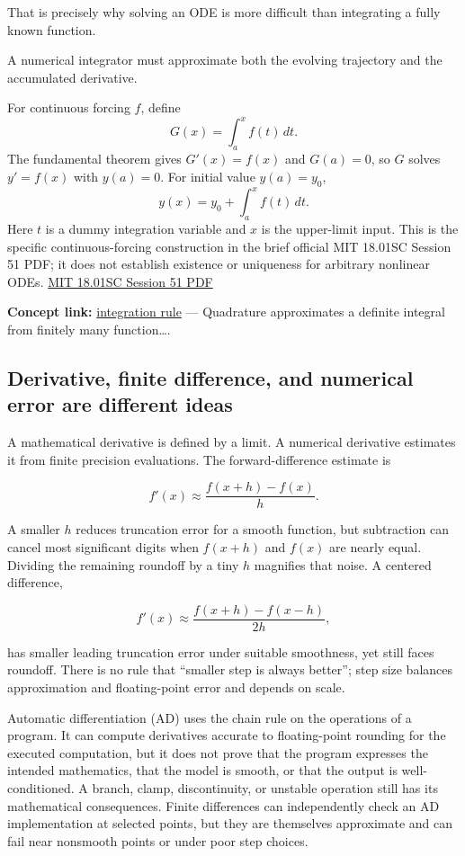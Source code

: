That is precisely why solving an ODE is more difficult than integrating a fully known function.

A numerical integrator must approximate both the evolving trajectory and the accumulated derivative.

For continuous forcing \(f\), define \[
G(x)=\int_a^x f(t)\,dt.
\] The fundamental theorem gives \(G'(x)=f(x)\) and \(G(a)=0\), so \(G\) solves \(y'=f(x)\) with \(y(a)=0\). For initial value \(y(a)=y_0\), \[
y(x)=y_0+\int_a^x f(t)\,dt.
\] Here \(t\) is a dummy integration variable and \(x\) is the upper-limit input. This is the specific continuous-forcing construction in the brief official MIT 18.01SC Session 51 PDF; it does not establish existence or uniqueness for arbitrary nonlinear ODEs. \href{https://ocw.mit.edu/courses/18-01sc-single-variable-calculus-fall-2010/2459faee7ec3308afd5cca2b95fad48e_MIT18_01SCF10_Ses51a.pdf}{MIT 18.01SC Session 51 PDF}

\textbf{Concept link:} \hyperref[02-foundations-ii-ch022]{integration rule} --- Quadrature approximates a definite integral from finitely many function\ldots.

\subsection{Derivative, finite difference, and numerical error are different ideas}\label{derivative-finite-difference-and-numerical-error-are-different-ideas}

A mathematical derivative is defined by a limit. A numerical derivative estimates it from finite precision evaluations. The forward-difference estimate is

\[
f'(x)\approx\frac{f(x+h)-f(x)}{h}.
\]

A smaller \(h\) reduces truncation error for a smooth function, but subtraction can cancel most significant digits when \(f(x+h)\) and \(f(x)\) are nearly equal. Dividing the remaining roundoff by a tiny \(h\) magnifies that noise. A centered difference,

\[
f'(x)\approx\frac{f(x+h)-f(x-h)}{2h},
\]

has smaller leading truncation error under suitable smoothness, yet still faces roundoff. There is no rule that ``smaller step is always better''; step size balances approximation and floating-point error and depends on scale.

Automatic differentiation (AD) uses the chain rule on the operations of a program. It can compute derivatives accurate to floating-point rounding for the executed computation, but it does not prove that the program expresses the intended mathematics, that the model is smooth, or that the output is well-conditioned. A branch, clamp, discontinuity, or unstable operation still has its mathematical consequences. Finite differences can independently check an AD implementation at selected points, but they are themselves approximate and can fail near nonsmooth points or under poor step choices.

